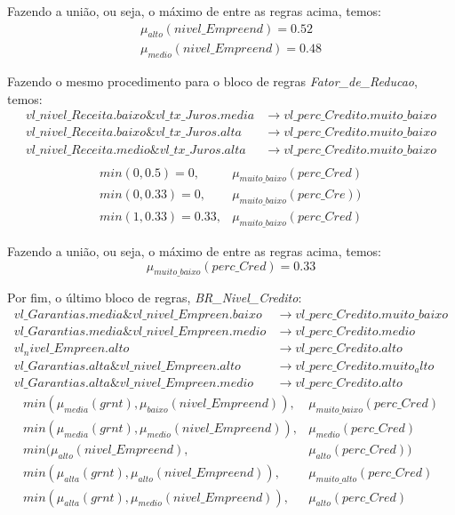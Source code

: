 \documentclass[12pt]{article}
\begin{document}
Fazendo a união, ou seja, o máximo de entre as regras acima, temos:
\begin{align*}
	\mu_{alto}(nivel\_Empreend)=0.52\\
	\mu_{medio}(nivel\_Empreend)=0.48
\end{align*}

Fazendo o mesmo procedimento para o bloco de regras \textit{Fator\_de\_Reducao}, temos:
\begin{align*}
	vl\_nivel\_Receita.baixo\&vl\_tx\_Juros.media&\to vl\_perc\_Credito.muito\_baixo\\
	vl\_nivel\_Receita.baixo\&vl\_tx\_Juros.alta&\to vl\_perc\_Credito.muito\_baixo\\
	vl\_nivel\_Receita.medio\&vl\_tx\_Juros.alta&\to vl\_perc\_Credito.muito\_baixo\\
\end{align*}
\begin{align*}
	min(0,0.5)=0,&\mu_{muito\_baixo}(perc\_Cred)\\
	min(0,0.33)=0,&\mu_{muito\_baixo}(perc\_Cre))\\
	min(1,0.33)=0.33,&\mu_{muito\_baixo}(perc\_Cred)
\end{align*}

Fazendo a união, ou seja, o máximo de entre as regras acima, temos:
\begin{equation*}
	\mu_{muito\_baixo}(perc\_Cred)=0.33
\end{equation*}

Por fim, o último bloco de regras, \textit{BR\_Nivel\_Credito}:
\begin{align*}
	vl\_Garantias.media\&vl\_nivel\_Empreen.baixo&\to vl\_perc\_Credito.muito\_baixo\\
	vl\_Garantias.media\&vl\_nivel\_Empreen.medio&\to vl\_perc\_Credito.medio\\
	vl_nivel\_Empreen.alto&\to vl\_perc\_Credito.alto\\
	vl\_Garantias.alta\&vl\_nivel\_Empreen.alto&\to vl\_perc\_Credito.muito_alto\\
	vl\_Garantias.alta\&vl\_nivel\_Empreen.medio&\to vl\_perc\_Credito.alto
\end{align*}
\begin{align*}
	min(\mu_{media}(grnt),\mu_{baixo}(nivel\_Empreend)),&\mu_{muito\_baixo}(perc\_Cred)\\
	min(\mu_{media}(grnt),\mu_{medio}(nivel\_Empreend)),&\mu_{medio}(perc\_Cred)\\
	min(\mu_{alto}(nivel\_Empreend),&\mu_{alto}(perc\_Cred))\\
	min(\mu_{alta}(grnt),\mu_{alto}(nivel\_Empreend)),&\mu_{muito\_alto}(perc\_Cred)\\
	min(\mu_{alta}(grnt),\mu_{medio}(nivel\_Empreend)),&\mu_{alto}(perc\_Cred)
\end{align*}
\end{document}
